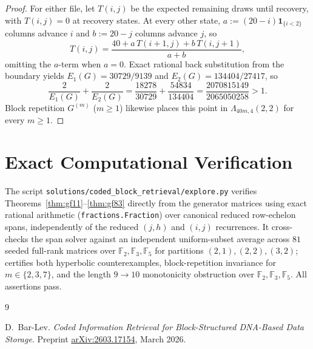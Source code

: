 \documentclass[11pt]{article}
\theoremstyle{plain}
\theoremstyle{definition}
\theoremstyle{remark}
\begin{document}
\begin{proof}
For either file, let $T(i, j)$ be the expected remaining draws until recovery, with $T(i, j) = 0$ at recovery states.
At every other state, $a := (20 - i)\mathbf{1}_{\{i < 2\}}$ columns advance $i$ and $b := 20 - j$ columns advance $j$, so
\[
T(i, j) = \frac{40 + a\,T(i + 1, j) + b\,T(i, j + 1)}{a + b},
\]
omitting the $a$-term when $a = 0$.
Exact rational back substitution from the boundary yields $E_1(G) = 30729/9139$ and $E_2(G) = 134404/27417$, so
\[
\frac{2}{E_1(G)} + \frac{2}{E_2(G)} = \frac{18278}{30729} + \frac{54834}{134404} = \frac{2070815149}{2065050258} > 1.
\]
Block repetition $G^{(m)}$ ($m \ge 1$) likewise places this point in $\Lambda_{40m, 4}(2, 2)$ for every $m \ge 1$.
\end{proof}

\section{Exact Computational Verification}

The script \texttt{solutions/coded\_block\_retrieval/explore.py} verifies Theorems~\ref{thm:gf11}--\ref{thm:gf83} directly from the generator matrices using exact rational arithmetic (\texttt{fractions.Fraction}) over canonical reduced row-echelon spans, independently of the reduced $(j, h)$ and $(i, j)$ recurrences.
It cross-checks the span solver against an independent uniform-subset average across $81$ seeded full-rank matrices over $\mathbb{F}_2, \mathbb{F}_3, \mathbb{F}_5$ for partitions $(2,1), (2,2), (3,2)$; certifies both hyperbolic counterexamples, block-repetition invariance for $m \in \{2, 3, 7\}$, and the length $9 \to 10$ monotonicity obstruction over $\mathbb{F}_2, \mathbb{F}_3, \mathbb{F}_5$. All assertions pass.

\begin{thebibliography}{9}

D.~Bar-Lev.
\emph{Coded Information Retrieval for Block-Structured DNA-Based Data Storage}.
Preprint \href{https://arxiv.org/abs/2603.17154}{arXiv:2603.17154}, March 2026.

\end{thebibliography}
\end{document}
